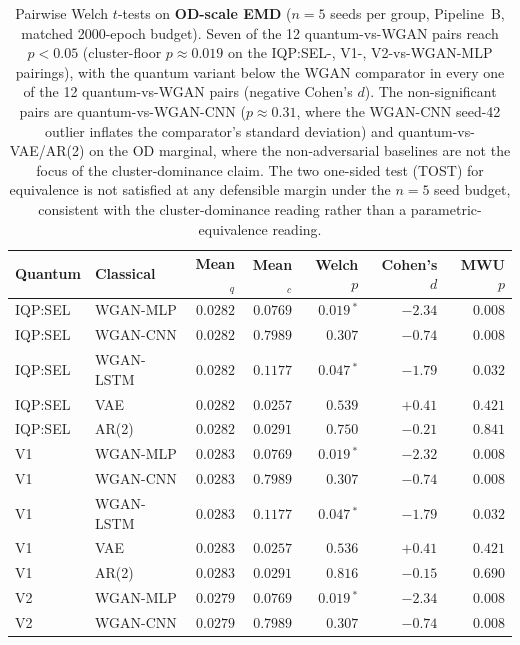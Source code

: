 \begin{table}[!htbp]
\centering
\caption{Pairwise Welch $t$-tests on \textbf{OD-scale EMD} ($n=5$ seeds
per group, Pipeline~B, matched 2000-epoch budget). Seven of the 12
quantum-vs-WGAN pairs reach $p<0.05$ (cluster-floor $p \approx 0.019$
on the IQP:SEL-, V1-, V2-vs-WGAN-MLP pairings), with the quantum
variant below the WGAN comparator in every one of the 12 quantum-vs-WGAN
pairs (negative Cohen's $d$). The non-significant pairs are
quantum-vs-WGAN-CNN ($p\approx 0.31$, where the WGAN-CNN seed-42 outlier
inflates the comparator's standard deviation) and quantum-vs-VAE/AR(2)
on the OD marginal, where the non-adversarial baselines are not the
focus of the cluster-dominance claim. The two one-sided test (TOST)
for equivalence is not satisfied at any defensible margin under the
$n=5$ seed budget, consistent with the cluster-dominance reading rather
than a parametric-equivalence reading.}
\label{tbl:welch_od_emd}
\scriptsize
\setlength{\tabcolsep}{4pt}
\begin{tabular}{@{}llrrrrr@{}}
\toprule
\textbf{Quantum} & \textbf{Classical} & \textbf{Mean}$_q$ & \textbf{Mean}$_c$ & \textbf{Welch $p$} & \textbf{Cohen's $d$} & \textbf{MWU $p$} \\
\midrule
IQP:SEL & WGAN-MLP & $0.0282$ & $0.0769$ & $0.019\,^{*}$ & $-2.34$ & $0.008$ \\
IQP:SEL & WGAN-CNN & $0.0282$ & $0.7989$ & $0.307$ & $-0.74$ & $0.008$ \\
IQP:SEL & WGAN-LSTM & $0.0282$ & $0.1177$ & $0.047\,^{*}$ & $-1.79$ & $0.032$ \\
IQP:SEL & VAE & $0.0282$ & $0.0257$ & $0.539$ & $+0.41$ & $0.421$ \\
IQP:SEL & AR(2) & $0.0282$ & $0.0291$ & $0.750$ & $-0.21$ & $0.841$ \\
V1 & WGAN-MLP & $0.0283$ & $0.0769$ & $0.019\,^{*}$ & $-2.32$ & $0.008$ \\
V1 & WGAN-CNN & $0.0283$ & $0.7989$ & $0.307$ & $-0.74$ & $0.008$ \\
V1 & WGAN-LSTM & $0.0283$ & $0.1177$ & $0.047\,^{*}$ & $-1.79$ & $0.032$ \\
V1 & VAE & $0.0283$ & $0.0257$ & $0.536$ & $+0.41$ & $0.421$ \\
V1 & AR(2) & $0.0283$ & $0.0291$ & $0.816$ & $-0.15$ & $0.690$ \\
V2 & WGAN-MLP & $0.0279$ & $0.0769$ & $0.019\,^{*}$ & $-2.34$ & $0.008$ \\
V2 & WGAN-CNN & $0.0279$ & $0.7989$ & $0.307$ & $-0.74$ & $0.008$ \\

\end{tabular}
\end{table}
